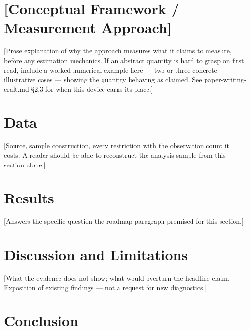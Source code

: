 \documentclass[12pt]{article}
\begin{document}
\section{[Conceptual Framework / Measurement Approach]}
\label{sec:framework}

[Prose explanation of why the approach measures what it claims to measure, before any
estimation mechanics. If an abstract quantity is hard to grasp on first read, include a
worked numerical example here — two or three concrete illustrative cases — showing the
quantity behaving as claimed. See paper-writing-craft.md §2.3 for when this device earns its
place.]

\section{Data}
\label{sec:data}

[Source, sample construction, every restriction with the observation count it costs. A
reader should be able to reconstruct the analysis sample from this section alone.]

\begin{table}[htbp]
  \centering
  \caption{[Summary statistics]}
  \label{tab:summary}
\end{table}

\section{Results}
\label{sec:results}

[Answers the specific question the roadmap paragraph promised for this section.]

\begin{table}[htbp]
  \centering
  \caption{[Main results]}
  \label{tab:main}
  
\end{table}

\section{Discussion and Limitations}
\label{sec:discussion}

[What the evidence does not show; what would overturn the headline claim. Exposition of
existing findings — not a request for new diagnostics.]

\section{Conclusion}
\label{sec:conclusion}
\end{document}
